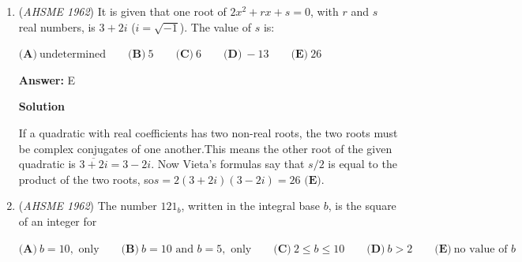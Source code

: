\begin{enumerate}
 $\textbf{(A)}\ 108 \qquad  \textbf{(B)}\ 90 \qquad  \textbf{(C)}\ 72 \qquad  \textbf{(D)}\ 54 \qquad  \textbf{(E)}\ 36$

 \textbf{Answer: }A



\textbf{Solution}

If the angles are in an arithmetic progression, they can be expressed as$a$, $a+n$, $a+2n$, $a+3n$, and $a+4n$ for some real numbers $a$ and $n$.Now we know that the sum of the degree measures of the angles of a pentagon is $180(5-2)=540$.Adding our expressions for the five angles together, we get $5a+10n=540$.We now divide by 5 to get $a+2n=108$. It so happens that $a+2n$ is one of the angles we defined earlier, so that angle must have a measure of $\boxed{108\textbf{ (A)}}$.(In fact, for any arithmetic progression with an odd number of terms,the middle term is equal to the average of all the terms.)

 



\textbf{Solution 2}

If we write the five terms as $a$, $a - n$, $a - 2n$, $a + n$ and $a + 2n$, we can see that adding them up, we get $5a = 540$ through this, we can see that $a = 108$, $\fbox{\textbf{(A)}}$



	\item (\textit{AHSME 1962}) It is given that one root of $2x^2 + rx + s = 0$, with $r$ and $s$ real numbers, is $3 + 2i$ ($i = \sqrt{-1}$). The value of $s$ is:


 $\textbf{(A)}\ \text{undetermined} \qquad  \textbf{(B)}\ 5 \qquad  \textbf{(C)}\ 6 \qquad  \textbf{(D)}\ -13 \qquad  \textbf{(E)}\ 26$

 \textbf{Answer: }E



\textbf{Solution}

If a quadratic with real coefficients has two non-real roots, the two roots must be complex conjugates of one another.This means the other root of the given quadratic is $\overline{3+2i}=3-2i$. Now Vieta's formulas say that $s/2$ is equal to the product of the two roots, so$s = 2(3+2i)(3-2i) = \boxed{26 \textbf{ (E)}}$.

 


	\item (\textit{AHSME 1962}) The number $121_b$, written in the integral base $b$, is the square of an integer for


 $\textbf{(A)}\ b = 10,\text{ only} \qquad  \textbf{(B)}\ b = 10 \text{ and } b = 5,\text{ only} \qquad  \textbf{(C)}\ 2 \leq b \leq 10 \qquad  \textbf{(D)}\ b > 2 \qquad  \textbf{(E)}\ \text{no value of } b$


\end{enumerate}
